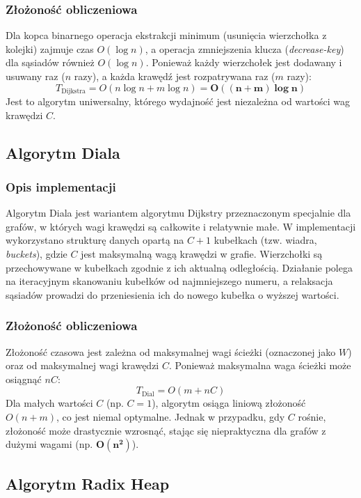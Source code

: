 \documentclass[11pt, a4paper]{article}
\begin{document}
	\subsubsection*{Złożoność obliczeniowa}
	Dla kopca binarnego operacja ekstrakcji minimum (usunięcia wierzchołka z kolejki) zajmuje czas $O(\log n)$, a operacja zmniejszenia klucza (\textit{decrease-key}) dla sąsiadów również $O(\log n)$. Ponieważ każdy wierzchołek jest dodawany i usuwany raz ($n$ razy), a każda krawędź jest rozpatrywana raz ($m$ razy):
	$$T_{\text{Dijkstra}} = O(n \log n + m \log n) = \mathbf{O((n+m) \log n)}$$
	Jest to algorytm uniwersalny, którego wydajność jest niezależna od wartości wag krawędzi $C$.
	
	\subsection{Algorytm Diala}
	
	\subsubsection*{Opis implementacji}
	Algorytm Diala jest wariantem algorytmu Dijkstry przeznaczonym specjalnie dla grafów, w których wagi krawędzi są całkowite i relatywnie małe. W implementacji wykorzystano strukturę danych opartą na $C+1$ kubełkach (tzw. wiadra, \textit{buckets}), gdzie $C$ jest maksymalną wagą krawędzi w grafie. Wierzchołki są przechowywane w kubełkach zgodnie z ich aktualną odległością. Działanie polega na iteracyjnym skanowaniu kubełków od najmniejszego numeru, a relaksacja sąsiadów prowadzi do przeniesienia ich do nowego kubełka o wyższej wartości.
	
	\subsubsection*{Złożoność obliczeniowa}
	Złożoność czasowa jest zależna od maksymalnej wagi ścieżki (oznaczonej jako $W$) oraz od maksymalnej wagi krawędzi $C$. Ponieważ maksymalna waga ścieżki może osiągnąć $nC$:
	$$T_{\text{Dial}} = O(m + nC)$$
	Dla małych wartości $C$ (np. $C=1$), algorytm osiąga liniową złożoność $O(n+m)$, co jest niemal optymalne. Jednak w przypadku, gdy $C$ rośnie, złożoność może drastycznie wzrosnąć, stając się niepraktyczna dla grafów z dużymi wagami (np. $\mathbf{O(n^2)}$).
	
	\subsection{Algorytm Radix Heap}
	
\end{document}
